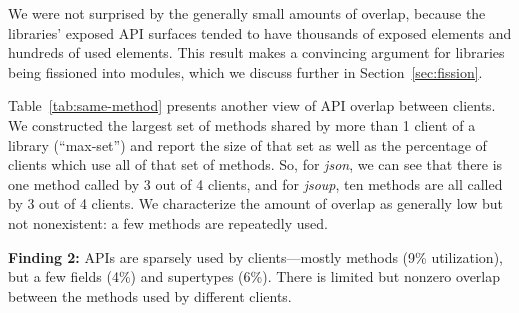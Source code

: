 We were not surprised by the generally small amounts of overlap, because the libraries' exposed API surfaces tended
to have thousands of exposed elements and hundreds of used elements. This result makes a convincing argument for libraries being fissioned into modules, which we discuss further in Section~\ref{sec:fission}. 

Table~\ref{tab:same-method} presents another view of API overlap between clients. We constructed the largest set
of methods shared by more than 1 client of a library (``max-set'') and report the size of that set as well as the percentage
of clients which use all of that set of methods. So, for \emph{json}, we can see that there is one method called
by 3 out of 4 clients, and for \emph{jsoup}, ten methods are all called
by 3 out of 4 clients. We characterize the amount of overlap as generally low but not
nonexistent: a few methods are repeatedly used.




\begin{mdframed}[
  leftmargin=\parindent,
  rightmargin=\parindent,
  skipabove=\topsep,
  skipbelow=\topsep
  ]
{\bf Finding 2:} APIs are sparsely used by clients---mostly methods (9\% utilization), but a few fields (4\%) and supertypes (6\%). There is limited but nonzero overlap between the methods used by different clients.
\end{mdframed}

